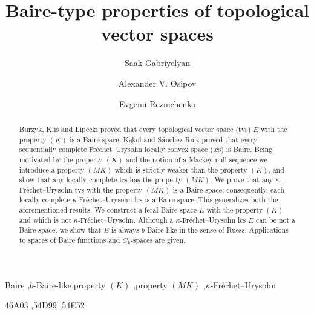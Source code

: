 \documentclass[preprint,11pt]{elsarticle}
\theoremstyle{definition}
\theoremstyle{remark}
\numberwithin{equation}{section}
\numberwithin{theorem}{section}
\newcommand{\CC}{C_k}
\begin{document}
\begin{frontmatter}


\title{Baire-type properties of topological vector spaces}


\author{Saak Gabriyelyan}%
\address{Department of Mathematics, Ben-Gurion University of the Negev, Beer-Sheva, Israel}

\author{Alexander V. Osipov}%
\address{Krasovskii Institute of Mathematics and Mechanics, Ural Federal University, Yekaterinburg, Russia}


\author{Evgenii Reznichenko}%
\address{Department of Mathematics, Lomonosov Mosow State University, Moscow, Russia}


\begin{abstract}
Burzyk,  Kli\'{s} and Lipecki proved that every topological vector space (tvs) $E$ with the property $(K)$ is a Baire space.
K\c{a}kol and S\'{a}nchez Ruiz proved that every sequentially complete Fr\'{e}chet--Urysohn locally convex space (lcs) is  Baire.
Being motivated by the property $(K)$ and the notion of a Mackey null sequence we introduce a property $(MK)$ which is strictly weaker than the property $(K)$, and show that any locally complete lcs has the property $(MK)$.  We prove that any $\kappa$-Fr\'{e}chet--Urysohn tvs with the property $(MK)$ is a Baire space; consequently, each locally complete $\kappa$-Fr\'{e}chet--Urysohn lcs is a Baire space. This generalizes both the aforementioned results. We construct a feral Baire space $E$ with the property $(K)$ and which is not $\kappa$-Fr\'{e}chet--Urysohn.
Although a $\kappa$-Fr\'{e}chet--Urysohn lcs $E$ can be not a Baire space, we show that $E$ is always $b$-Baire-like in the sense of Ruess. Applications to spaces of Baire functions and $\CC$-spaces are given.

\end{abstract}

\begin{keyword}
Baire \sep $b$-Baire-like\sep property $(K)$ \sep property $(MK)$ \sep $\kappa$-Fr\'{e}chet--Urysohn


\MSC[2010] 46A03 \sep 54D99 \sep 54E52  %

\end{keyword}

\end{frontmatter}
\end{document}
